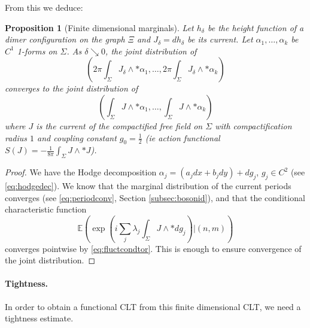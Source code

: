 \documentclass[10pt]{article}
\newcommand{\E}{\mathbb{E}}
\newtheorem{Prop}[thm]{Proposition}
\begin{document}
From this we deduce:

\begin{Prop}[Finite dimensional marginals]\label{Prop:findimmargtor}
Let $h_\delta$ be the height function of a dimer configuration on the graph $\Xi$ and $J_\delta=dh_\delta$ be its current. Let $\alpha_1,\dots,\alpha_k$ be $C^1$ 1-forms on $\Sigma$. As $\delta\searrow 0$, the joint distribution of 
$$\left(2\pi\int_\Sigma J_\delta\wedge \ast\alpha_1,\dots,2\pi\int_\Sigma J_\delta\wedge\ast\alpha_k\right)$$
converges to the joint distribution of 
$$\left(\int_\Sigma J\wedge\ast \alpha_1,\dots,\int_\Sigma J\wedge\ast\alpha_k\right)$$
where $J$ is the current of the compactified free field on $\Sigma$ with compactification radius $1$ and coupling constant $g_0=\frac 12$ (ie action functional $S(J)=-\frac 1{8\pi}\int_\Sigma J\wedge\ast J$).
\end{Prop}
\begin{proof}
We have the Hodge decomposition $\alpha_j=(a_jdx+b_jdy)+dg_j$, $g_j\in C^2$ (see \eqref{eq:hodgedec}). We know that the marginal distribution of the current periods converges (see \eqref{eq:periodconv}, Section \ref{subsec:bosonid}), and that the conditional characteristic function
$$\E(\exp(i\sum_j\lambda_j\int_\Sigma J\wedge \ast dg_j)|(n,m))$$
converges pointwise by \eqref{eq:fluctcondtor}. This is enough to ensure convergence of the joint distribution.
\end{proof}

\paragraph{Tightness.\\}
In order to obtain a functional CLT from this finite dimensional CLT, we need a tightness estimate.
\end{document}
